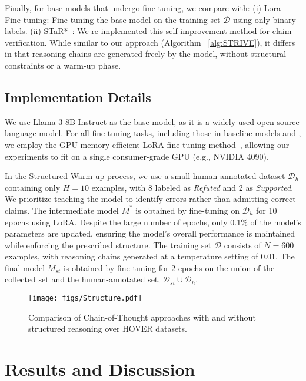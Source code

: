 Finally, for base models that undergo fine-tuning, we compare with: (i) Lora Fine-tuning: Fine-tuning the base model on the training set $\mathcal{D}$ using only binary labels. (ii) STaR*~\cite{zelikman2022star}:  We re-implemented this self-improvement method for claim verification. While similar to our approach (Algorithm~ \ref{alg:STRIVE}), it differs in that reasoning chains are generated freely by the model, without structural constraints or a warm-up phase.

\subsection{Implementation Details}
We use Llama-3-8B-Instruct as the base model, as it is a widely used open-source language model. For all fine-tuning tasks, including those in baseline models and \themodel, we employ the GPU memory-efficient LoRA fine-tuning method~\cite{hu2021lora}, allowing our experiments to fit on a single consumer-grade GPU (e.g., NVIDIA 4090).

In the Structured Warm-up process, we use a small human-annotated dataset $\mathcal{D}_h$ containing only $H=10$ examples, with 8 labeled as \textit{Refuted} and 2 as \textit{Supported}. We prioritize teaching the model to identify errors rather than admitting correct claims. The intermediate model $M^*$ is obtained by fine-tuning on $\mathcal{D}_h$ for 10 epochs using LoRA. Despite the large number of epochs, only 0.1\% of the model's parameters are updated, ensuring the model’s overall performance is maintained while enforcing the prescribed structure. The training set $\mathcal{D}$ consists of $N=600$ examples, with reasoning chains generated at a temperature setting of 0.01. The final model $M_{st}$ is obtained by fine-tuning for 2 epochs on the union of the collected set and the human-annotated set, $\mathcal{D}_{st} \cup \mathcal{D}_h$.

\begin{figure}[t]
  \texttt{[image: figs/Structure.pdf]}
  \caption{Comparison of Chain-of-Thought approaches with and without structured reasoning over HOVER datasets.}
  \label{fig:structure}
\end{figure}

\section{Results and Discussion}
